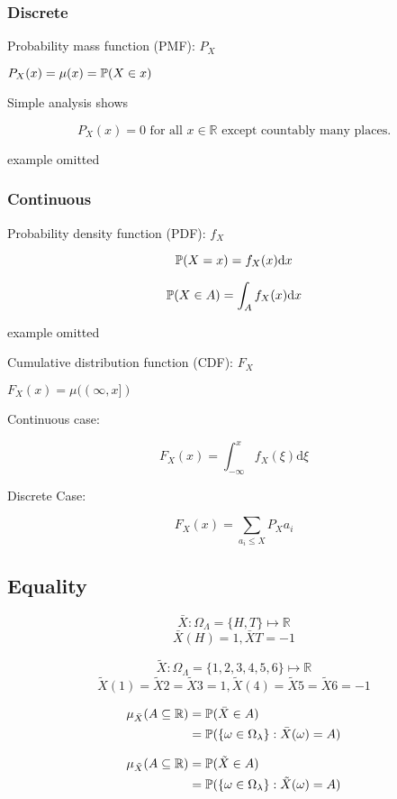 \subsubsection{Discrete}

Probability mass function (PMF): $P_X$

$
P_X(x)=\mu({x})=\mathbb{P}(X\in x)
$

Simple analysis shows

$$
P_X(x)=0 \text{ for all }x \in \mathbb{R} \text{ except countably many places.}
$$

example omitted

\subsubsection{Continuous}

Probability density function (PDF): $f_X$

$$
\mathbb{P}(X=x)=f_X(x)\text{d}x
$$

$$
\mathbb{P}(X\in A)=\int_A f_X(x)\text{d}x
$$

example omitted

Cumulative distribution function (CDF): $F_X$

$F_X(x)=\mu( (\infty,x] )$

Continuous case:

$$
F_X(x)=\int_{-\infty}^{x}f_X(\xi)\text{d}\xi
$$

Discrete Case:

$$
F_X(x)=\sum_{a_i\leq X}P_X{a_i}
$$

\bigskip

\subsection{Equality}

$$
\bar{X}:\Omega_\Lambda=\{H,T\}\mapsto \mathbb{R}
$$
$$
\bar{X}(H)=1, \bar{X}{T}=-1
$$

$$
\tilde{X}:\Omega_\Lambda=\{1,2,3,4,5,6\}\mapsto \mathbb{R}
$$
$$
\tilde{X}(1)=\tilde{X}{2}=\tilde{X}{3}=1,
\tilde{X}(4)=\tilde{X}{5}=\tilde{X}{6}=-1
$$

\begin{align*}
\mu_{\bar{X}} (A \subseteq \mathbb{R})
&=\mathbb{P}( \bar{X}\in A )
\\
&=\mathbb{P}( \{ \omega\in\Omega_\lambda \}:\bar{X}(\omega)=A)
\end{align*}

\begin{align*}
\mu_{\tilde{X}} (A\subseteq\mathbb{R})
&=\mathbb{P}( \tilde{X}\in A )
\\
&=\mathbb{P}(\{\omega\in\Omega_\lambda\}:\tilde{X}(\omega)=A)
\end{align*}

